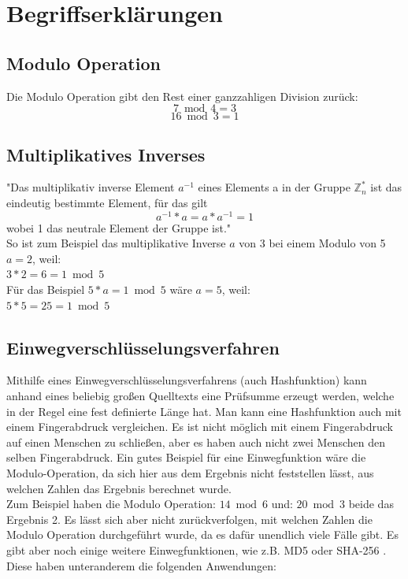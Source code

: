 \documentclass[12pt,a4paper]{scrartcl}
\begin{document}

\pagebreak


\section{Begriffserklärungen}
	\subsection{Modulo Operation} %
	Die Modulo Operation gibt den Rest einer ganzzahligen Division zurück:
	$$ {7 \bmod 4 = 3} $$
	$$ {16 \bmod 3 = 1} $$
	
	\subsection{Multiplikatives Inverses}
	"Das multiplikativ inverse Element $a^{-1}$ eines Elements a in der Gruppe $\mathbb{Z}_n ^*$ ist das eindeutig bestimmte Element, für das gilt $${a^{-1} * a  =  a * a^{-1}  =  1}$$ wobei 1 das neutrale Element der Gruppe ist." \cite{hwlang} \\
	
	So ist zum Beispiel das multiplikative Inverse $a$ von 3 bei einem Modulo von 5 $a=2$, weil: \\
	${3 * 2 = 6 = 1 \bmod 5}$ \\
	
	Für das Beispiel ${5 * a = 1 \bmod 5}$ wäre $a=5$, weil: \\
	${5 * 5 = 25 = 1 \bmod 5}$ \\
	
	\subsection{Einwegverschlüsselungsverfahren}
	Mithilfe eines Einwegverschlüsselungsverfahrens (auch Hashfunktion) kann anhand eines beliebig großen Quelltexts eine Prüfsumme erzeugt werden, welche in der Regel eine fest definierte Länge hat. Man kann eine Hashfunktion auch mit einem Fingerabdruck vergleichen. Es ist nicht möglich mit einem Fingerabdruck auf einen Menschen zu schließen, aber es haben auch nicht zwei Menschen den selben Fingerabdruck.\cite[S.11]{Beutelspacher2015-jl} Ein gutes Beispiel für eine Einwegfunktion wäre die Modulo-Operation, da sich hier aus dem Ergebnis nicht feststellen lässt, aus welchen Zahlen das Ergebnis berechnet wurde. \\
	Zum Beispiel haben die Modulo Operation: ${14 \bmod 6}$  und: ${20 \bmod 3}$ beide das Ergebnis 2. Es lässt sich aber nicht zurückverfolgen, mit welchen Zahlen die Modulo Operation durchgeführt wurde, da es dafür unendlich viele Fälle gibt. Es gibt aber noch einige weitere Einwegfunktionen, wie z.B. MD5 oder SHA-256 \cite[S.11]{Beutelspacher2015-jl}. Diese haben unteranderem die folgenden Anwendungen:
	
\end{document}
